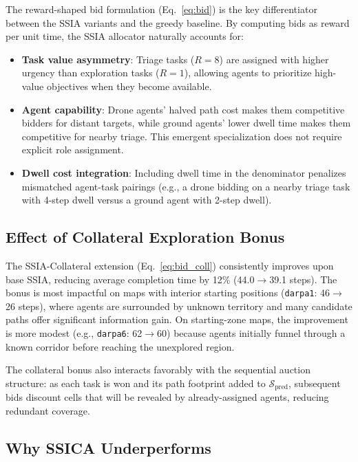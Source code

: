 \documentclass[conference]{IEEEtran}
\begin{document}
The reward-shaped bid formulation (Eq.~\ref{eq:bid}) is the key differentiator between the SSIA variants and the greedy baseline. By computing bids as reward per unit time, the SSIA allocator naturally accounts for:
\begin{itemize}
    \item \textbf{Task value asymmetry}: Triage tasks ($R=8$) are assigned with higher urgency than exploration tasks ($R=1$), allowing agents to prioritize high-value objectives when they become available.
    \item \textbf{Agent capability}: Drone agents' halved path cost makes them competitive bidders for distant targets, while ground agents' lower dwell time makes them competitive for nearby triage. This emergent specialization does not require explicit role assignment.
    \item \textbf{Dwell cost integration}: Including dwell time in the denominator penalizes mismatched agent-task pairings (e.g., a drone bidding on a nearby triage task with 4-step dwell versus a ground agent with 2-step dwell).
\end{itemize}

\subsection{Effect of Collateral Exploration Bonus}

The SSIA-Collateral extension (Eq.~\ref{eq:bid_coll}) consistently improves upon base SSIA, reducing average completion time by 12\% (44.0$\to$39.1 steps). The bonus is most impactful on maps with interior starting positions (\texttt{darpa1}: 46$\to$26 steps), where agents are surrounded by unknown territory and many candidate paths offer significant information gain. On starting-zone maps, the improvement is more modest (e.g., \texttt{darpa6}: 62$\to$60) because agents initially funnel through a known corridor before reaching the unexplored region.

The collateral bonus also interacts favorably with the sequential auction structure: as each task is won and its path footprint added to $\mathcal{S}_{\text{pred}}$, subsequent bids discount cells that will be revealed by already-assigned agents, reducing redundant coverage.

\subsection{Why SSICA Underperforms}
\end{document}
